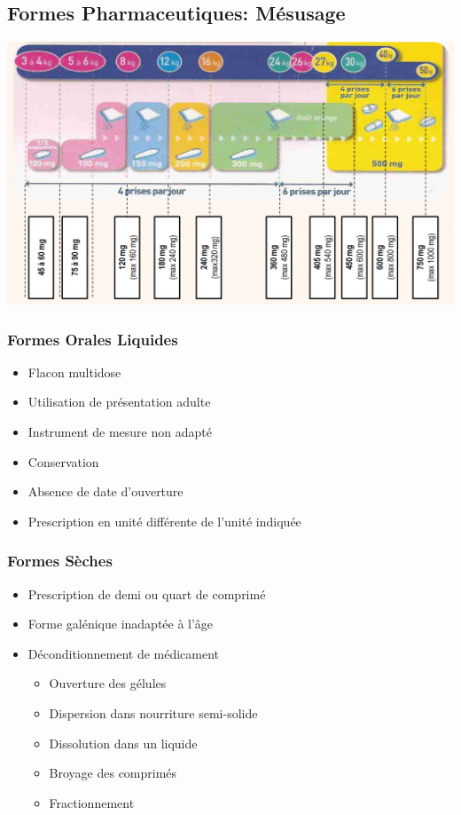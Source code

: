 \documentclass[11pt]{article}
\begin{document}
\subsection{Formes Pharmaceutiques: Mésusage}
\label{sec:org84fa162}
\begin{center}
\includegraphics[width=.9\linewidth]{./pedia_galenique.png}
\end{center}
\subsubsection{Formes Orales Liquides}
\label{sec:orgb0911ab}
\begin{itemize}
\item Flacon multidose
\item Utilisation de présentation adulte
\item Instrument de mesure non adapté
\item Conservation
\item Absence de date d'ouverture
\item Prescription en unité différente de l'unité indiquée
\end{itemize}
\subsubsection{Formes Sèches}
\label{sec:orga7400a8}
\begin{itemize}
\item Prescription de demi ou quart de comprimé
\item Forme galénique inadaptée à l'âge
\item Déconditionnement de médicament
\begin{itemize}
\item Ouverture des gélules
\item Dispersion dans nourriture semi-solide
\item Dissolution dans un liquide
\item Broyage des comprimés
\item Fractionnement
\end{itemize}
\end{itemize}
\end{document}
